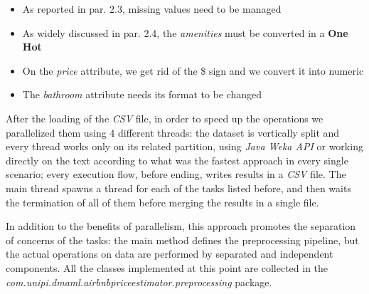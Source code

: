\begin{itemize}
	\item As reported in par. 2.3, missing values need to be managed
	\item As widely discussed in par. 2.4, the \textit{amenities} must be converted in a \textbf{One Hot}
	\item On the \textit{price} attribute, we get rid of the \$ sign and we convert it into numeric
	\item The \textit{bathroom} attribute needs its format to be changed
\end{itemize}

After the loading of the \textit{CSV} file, in order to speed up the operations we parallelized them using 4 different threads: the dataset is vertically split and every thread works only on its related partition, using \textit{Java Weka API} or working directly on the text according to what was the fastest approach in every single scenario; every execution flow, before ending, writes results in a \textit{CSV} file. The main thread spawns a thread for each of the tasks listed before, and then waits the termination of all of them before merging the results in a single file.

In addition to the benefits of parallelism, this approach promotes the separation of concerns of the tasks: the main method defines the preprocessing pipeline, but the actual operations on data are performed by separated and independent components. All the classes implemented at this point are collected in the \textit{com.unipi.dmaml.airbnbpriceestimator.preprocessing} package.
